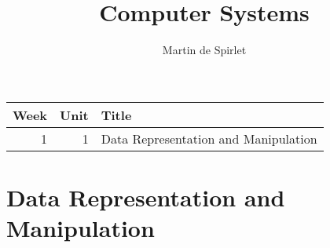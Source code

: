 \documentclass[
  11pt,
  a4paper,
]{article}
\title{Computer Systems}
\author{Martin de Spirlet}
\date{}
\begin{document}

\maketitle

\vspace*{\fill}

\begin{table}[htp]
  \centering
  \begin{tabular}{rrl}
    \toprule
    Week & Unit & Title \\
    \midrule
    1 &  1 & Data Representation and Manipulation \\
    \bottomrule
  \end{tabular}
\end{table}

\vspace*{\fill}
\addvspace{1in}

\clearpage


\section{Data Representation and Manipulation}

\end{document}
